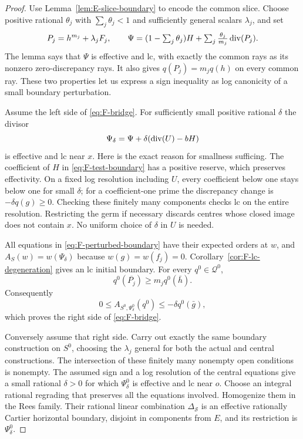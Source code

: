 \begin{proof}
Use Lemma~\ref{lem:E-slice-boundary} to encode the common slice.
Choose positive rational $\theta_j$ with $\sum_j\theta_j<1$ and
sufficiently general scalars $\lambda_j$, and set
\begin{equation}\label{eq:F-test-boundary}
 P_j=h^{m_j}+\lambda_jF_j,
 \qquad
 \Psi=(1-\textstyle\sum_j\theta_j)H+
                \sum_j\frac{\theta_j}{m_j}\operatorname{div}(P_j).
\end{equation}
The lemma says that $\Psi$ is effective and lc, with exactly the
common rays as its nonzero zero-discrepancy rays. It also gives
$q(P_j)=m_jq(h)$ on every common ray. These two properties let us
express a sign inequality as log canonicity of a small boundary
perturbation.

Assume the left side of \eqref{eq:F-bridge}.  For sufficiently
small positive rational $\delta$ the divisor
\begin{equation}\label{eq:F-perturbed-boundary}
 \Psi_\delta=\Psi+\delta(\operatorname{div}(U)-bH)
\end{equation}
is effective and lc near $x$.  Here is the exact reason for
smallness sufficing.  The coefficient of $H$ in
\eqref{eq:F-test-boundary} has a positive reserve, which preserves
effectivity.  On a fixed log resolution including $U$, every
coefficient below one stays below one for small $\delta$; for
a coefficient-one prime the discrepancy change is
$-\delta q(g)\ge0$.  Checking these finitely many components
checks lc on the entire resolution.  Restricting the germ if
necessary discards centres whose closed image does not contain
$x$.  No uniform choice of $\delta$ in $U$ is needed.

All equations in \eqref{eq:F-perturbed-boundary} have their
expected orders at $w$, and
$A_S(w)=w(\Psi_\delta)$ because $w(g)=w(f_j)=0$.
Corollary~\ref{cor:F-lc-degeneration} gives an lc initial boundary.
For every $q^0\in\mathcal Q^0$,
\[
 q^0(\overline{P_j})\ge m_jq^0(\bar h).
\]
Consequently
\[
 0\le A_{S^0,\Psi_\delta^0}(q^0)
       \le-\delta q^0(\bar g),
\]
which proves the right side of \eqref{eq:F-bridge}.

Conversely assume that right side.  Carry out exactly the same
boundary construction on $S^0$, choosing the $\lambda_j$ general
for both the actual and central constructions.  The intersection
of these finitely many nonempty open conditions is nonempty.
The assumed sign and a log resolution of the central equations
give a small rational $\delta>0$ for which $\Psi_\delta^0$ is
effective and lc near $o$.  Choose an integral rational regrading
that preserves all the equations involved.  Homogenize them in
the Rees family.  Their rational linear combination
$\Delta_{\mathcal S}$ is an effective rationally Cartier
horizontal boundary, disjoint in components from $E$, and its
restriction is $\Psi_\delta^0$.


\end{proof}
